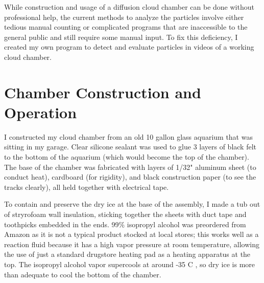 \documentclass[notitlepage]{article}
\begin{document}
While construction and usage of a diffusion cloud chamber can be done without professional help\cite{classroom}, the current methods to analyze the particles involve either tedious manual counting or complicated programs that are inaccessible to the general public and still require some manual input.  To fix this deficiency, I created my own program to detect and evaluate particles in videos of a working cloud chamber.  

\section{Chamber Construction and Operation}

I constructed my cloud chamber from an old 10 gallon glass aquarium that was sitting in my garage. Clear silicone sealant was used to glue 3 layers of black felt to the bottom of the aquarium (which would become the top of the chamber). The base of the chamber was fabricated with layers of 1/32" aluminum sheet (to conduct heat), cardboard (for rigidity), and black construction paper (to see the tracks clearly), all held together with electrical tape.

To contain and preserve the dry ice at the base of the assembly, I made a tub out of stryrofoam wall insulation, sticking together the sheets with duct tape and toothpicks embedded in the ends.  99\% isopropyl alcohol was preordered from Amazon as it is not a typical product stocked at local stores; this works well as a reaction fluid because it has a high vapor pressure at room temperature, allowing the use of just a standard drugstore heating pad as a heating apparatus at the top. The isopropyl alcohol vapor supercools at around -35 \degree{}C \cite{isopropanol}, so dry ice is more than adequate to cool the bottom of the chamber.
\end{document}
